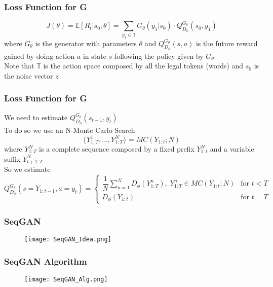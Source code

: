 \documentclass{beamer}
\newcommand\E{\ensuremath{\mathbb{E}}}
\newcommand\T{\ensuremath{\mathbb{T}}}
\begin{document}
\begin{frame}
\frametitle{Loss Function for G}
$$
J(\theta) = \E[R_t | s_0, \theta ] =
\sum_{y_1 \in \T}
G_\theta ( y_1 | s_0) \cdot
Q_{D_\phi}^{G_\theta} ( s_0, y_1)
$$
where $G_\theta$ is the generator with parameters $\theta$ and $ Q_{D_\phi}^{G_\theta} (s, a) $
is the future reward gained by doing action $a$ in state $s$ following the policy given by $G_\theta$
\\
Note that $\T$ is the action space composed by all the legal tokens (words) and $s_0$ is the noise vector $z$
\end{frame}

\begin{frame}
\frametitle{Loss Function for G}
We need to estimate $ Q_{D_\phi}^{G_\theta} ( s_{t-1}, y_t) $
\\
To do so we use an N-Monte Carlo Search
$$
\{ 
  Y_{1:T}^1,
  \dots,
  Y_{1:T}^N
\}
=
MC (Y_{1:t}; N)
$$
where $Y_{1:T}^N$ is a complete sequence composed by a fixed prefix $Y_{1:t}^N$ and a variable suffix $Y_{t+1:T}^N$
\\
\vspace{.3cm}
So we estimate
$$
Q_{D_\phi}^{G_\theta}
( s = Y_{1:t-1} ,
a = y_t)
=
\left\{\begin{array}{lr}
    \dfrac{1}{N} \sum_{n=1}^N D_\phi (Y_{1:T}^n) ,\; Y_{1:T}^n \in MC(Y_{1:t};N)
      & \textrm{for } t < T \\

    D_\phi (Y_{1:t}) & \textrm{for } t = T

\end{array}\right.
$$
\end{frame}

\begin{frame}
\frametitle{SeqGAN}
\begin{figure}[ht]
  \texttt{[image: SeqGAN\_Idea.png]}
\end{figure}
\end{frame}


\begin{frame}
\frametitle{SeqGAN Algorithm}
\begin{figure}[ht]
  \texttt{[image: SeqGAN\_Alg.png]}
\end{figure}
\end{frame}



\end{document}
